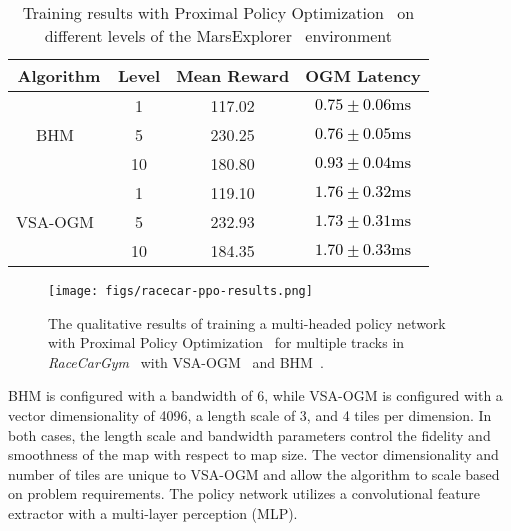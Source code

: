 \begingroup
\renewcommand{\arraystretch}{1.2}
\begin{table}[]
\centering
\caption{Training results with Proximal Policy Optimization~\cite{schulman2017proximalpolicyoptimizationalgorithms} on different levels of the MarsExplorer~\cite{Koutras2021MarsExplorer} environment}
\label{tab:mars-results}
\begin{tabular}{cccc}
\toprule
\textbf{Algorithm} & \textbf{Level} & \textbf{Mean Reward} & \textbf{OGM Latency} \\
\midrule
                                  & 1     &  117.02  & \textcolor{black}{$0.75\pm0.06\text{ms}$}        \\
BHM~\cite{senanayake2017bayesian} & 5     &  230.25  & \textcolor{black}{$0.76\pm0.05\text{ms}$}        \\
                                  & 10    &  180.80   & \textcolor{black}{$0.93\pm0.04\text{ms}$}        \\
\midrule
                           & 1     & 119.10  & \textcolor{black}{$1.76\pm0.32\text{ms}$}        \\
VSA-OGM~\cite{snyder2024brain} & 5     & 232.93  & \textcolor{black}{$1.73\pm0.31\text{ms}$}        \\
                           & 10    & 184.35   & \textcolor{black}{$1.70\pm0.33\text{ms}$}        \\ 
\bottomrule
\end{tabular}
\end{table}
\endgroup

\begin{figure*}[ht]
    \centering
    \texttt{[image: figs/racecar-ppo-results.png]}
    \caption{The qualitative results of training a multi-headed policy network with Proximal Policy Optimization~\cite{schulman2017proximalpolicyoptimizationalgorithms} for multiple tracks in \textit{RaceCarGym}~\cite{Brunnbauer_racecar_gym} with VSA-OGM~\cite{snyder2024brain} and BHM~\cite{senanayake2017bayesian}.}
    \label{fig:racar-results}
\end{figure*}





BHM is configured with a bandwidth of 6, while VSA-OGM is configured with a vector dimensionality of 4096, a length scale of 3, and 4 tiles per dimension. In both cases, the length scale and bandwidth parameters control the fidelity and smoothness of the map with respect to map size. The vector dimensionality and number of tiles are unique to VSA-OGM and allow the algorithm to scale based on problem requirements.
The policy network utilizes a convolutional feature extractor with a multi-layer perception (MLP).


